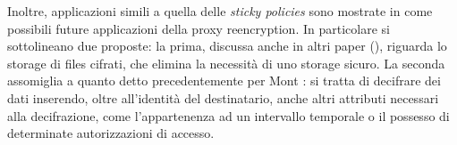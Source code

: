 Inoltre, applicazioni simili a quella delle \textit{sticky policies} sono mostrate in \cite{green2007identity} come possibili future applicazioni della proxy reencryption. In particolare si sottolineano due proposte: la prima, discussa anche in altri paper (), riguarda lo storage di files cifrati, che elimina la necessit\`a di uno storage sicuro. La seconda assomiglia a quanto detto precedentemente per Mont \cite{mont2003towards}: si tratta di decifrare dei dati inserendo, oltre all’identit\`a del destinatario, anche altri attributi necessari alla decifrazione, come l’appartenenza ad un intervallo temporale o il possesso di determinate autorizzazioni di accesso.
